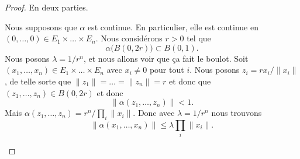 \begin{proof}
	En deux parties.
	\begin{subproof}
		\spitem[\( \Rightarrow\)]
		Nous supposons que \( \alpha\) est continue. En particulier, elle est continue en \( (0,\ldots,0)\in E_1\times \ldots\times E_n\). Nous considérons \( r>0\) tel que
		\begin{equation}
			\alpha\big( B(0,2r) \big)\subset B(0,1).
		\end{equation}
		Nous posons \( \lambda=1/r^{n}\), et nous allons voir que ça fait le boulot. Soit \( (x_1,\ldots,x_n)\in E_1\times \ldots \times E_n\) avec \( x_i\neq 0\) pour tout \( i\). Nous posons \( z_i=rx_i/\| x_i \|\), de telle sorte que \( \| z_1 \|=\ldots =\| z_n \|=r\) et donc que \( (z_1,\ldots,z_n)\in B(0,2r)\) et donc
		\begin{equation}
			\| \alpha(z_1,\ldots,z_n) \|<1.
		\end{equation}
		Mais \( \alpha(z_1,\ldots,z_n)=r^n/\prod_i\| x_i \|\). Donc avec \( \lambda=1/r^n\) nous trouvons
		\begin{equation}
			\| \alpha(x_1,\ldots,x_n) \|\leq \lambda \prod_{i}\| x_i \|.
		\end{equation}


\end{subproof}
\end{proof}
